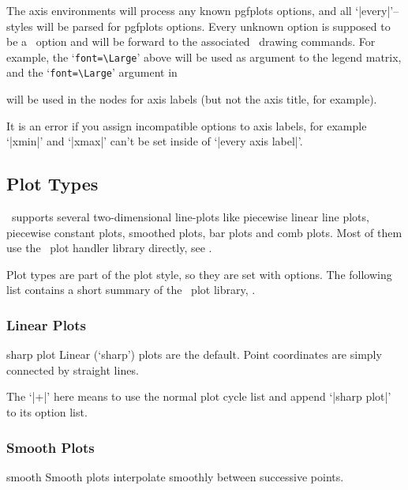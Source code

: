 The axis environments will process any known pgfplots options, and all `|every|'--styles will be parsed for pgfplots options. Every unknown option is supposed to be a \Tikz\ option and will be forward to the associated \Tikz\ drawing commands. For example, the `\lstinline{font=\Large}' above will be used as argument to the legend matrix, and the `\lstinline{font=\Large}' argument in 
\begin{codeexample}
\end{codeexample}
will be used in the nodes for axis labels (but not the axis title, for example).

It is an error if you assign incompatible options to axis labels, for example `|xmin|' and `|xmax|' can't be set inside of `|every axis label|'.


\subsection{Plot Types}
\PGFPlots\ supports several two-dimensional line-plots like piecewise linear line plots, piecewise constant plots, smoothed plots, bar plots and comb plots. Most of them use the \PGF\ plot handler library directly, see \cite[section 18.8]{tikz}.

Plot types are part of the plot style, so they are set with options. The following list contains a short summary of the \PGF\ plot library, \cite[section 18.8]{tikz}.


\subsubsection{Linear Plots}
\begin{plottype}{sharp plot}
Linear (`sharp') plots are the default. Point coordinates are simply connected by straight lines. 
\begin{codeexample}[]
\end{codeexample}

The `|+|' here means to use the normal plot cycle list and append `|sharp plot|' to its option list.
\end{plottype}

\subsubsection{Smooth Plots}
\begin{plottype}{smooth}
Smooth plots interpolate smoothly between successive points.
\begin{codeexample}[]
\end{codeexample}
\end{plottype}

